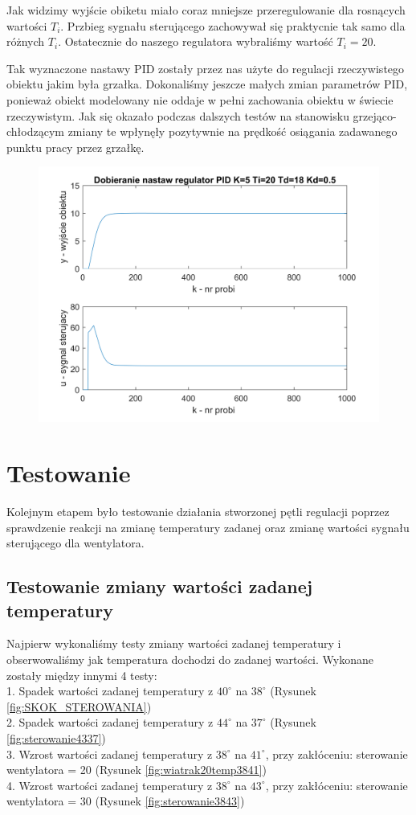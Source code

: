 \documentclass[12pt, a4paper]{article}
\begin{document}
Jak widzimy wyjście obiketu miało coraz mniejsze przeregulowanie dla rosnących wartości $T_{i}$. Przbieg sygnału sterującego zachowywał się praktycnie tak samo dla różnych $T_{i}$. Ostatecznie do naszego regulatora wybraliśmy wartość $T_{i} = 20$.

Tak wyznaczone nastawy PID zostały przez nas użyte do regulacji rzeczywistego obiektu jakim była grzałka. Dokonaliśmy jeszcze małych zmian parametrów PID, ponieważ obiekt modelowany nie oddaje w pełni zachowania obiektu w świecie rzeczywistym. Jak się okazało podczas dalszych testów na stanowisku grzejąco-chłodzącym zmiany te wpłynęły pozytywnie na prędkość osiągania zadawanego punktu pracy przez grzałkę. 

\begin{figure}[H]
	\centering
	\includegraphics[width=0.9\linewidth]{pid_ostateczny.png}
	\caption{}
\end{figure}

\section{Testowanie}
Kolejnym etapem było testowanie działania stworzonej pętli regulacji poprzez sprawdzenie reakcji na zmianę temperatury zadanej oraz zmianę wartości sygnału sterującego dla wentylatora. 

\subsection{Testowanie zmiany wartości zadanej temperatury}
Najpierw wykonaliśmy testy zmiany wartości zadanej temperatury i obserwowaliśmy jak temperatura dochodzi do zadanej wartości. Wykonane zostały między innymi 4 testy: \\
1. Spadek wartości zadanej temperatury z  $40^\circ$ na $38^\circ$ (Rysunek \ref{fig:SKOK_STEROWANIA}) \\
2. Spadek wartości zadanej temperatury z  $44^\circ$ na $37^\circ$ (Rysunek \ref{fig:sterowanie4337}) \\
3. Wzrost wartości zadanej temperatury z  $38^\circ$ na $41^\circ$, przy zakłóceniu: sterowanie wentylatora = 20 (Rysunek \ref{fig:wiatrak20temp3841}) \\
4. Wzrost wartości zadanej temperatury z  $38^\circ$ na $43^\circ$, przy zakłóceniu: sterowanie wentylatora = 30  (Rysunek \ref{fig:sterowanie3843}) \\
\end{document}

